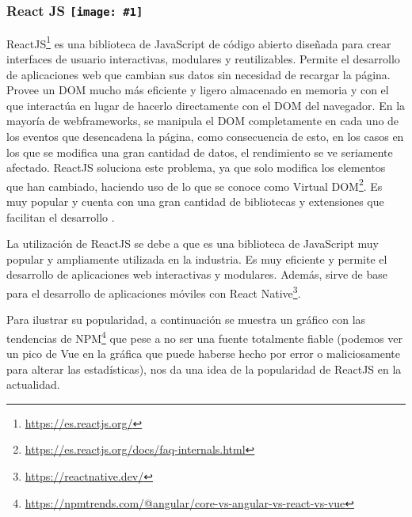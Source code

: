 
\renewcommand{\icon}[1]{\texttt{[image: \#1]}}
\subsubsection*{React JS \protect\icon{./imagenes/react_logo.png}}

ReactJS\footnote{\url{https://es.reactjs.org/}} es una biblioteca de JavaScript de código abierto diseñada para crear interfaces de usuario interactivas, modulares y reutilizables. Permite el desarrollo de aplicaciones web que cambian sus datos sin necesidad de recargar la página. Provee un DOM mucho más eficiente y ligero almacenado en memoria y con el que interactúa en lugar de hacerlo directamente con el DOM del navegador. En la mayoría de webframeworks, se manipula el DOM completamente en cada uno de los eventos que desencadena la página, como consecuencia de esto, en los casos en los que se modifica una gran cantidad de datos, el rendimiento se ve seriamente afectado. ReactJS soluciona este problema, ya que solo modifica los elementos que han cambiado, haciendo uso de lo que se conoce como Virtual DOM\footnote{\url{https://es.reactjs.org/docs/faq-internals.html}}. Es muy popular y cuenta con una gran cantidad de bibliotecas y extensiones que facilitan el desarrollo \cite{aggarwal2018modern}.\newline

La utilización de ReactJS se debe a que es una biblioteca de JavaScript muy popular y ampliamente utilizada en la industria. Es muy eficiente y permite el desarrollo de aplicaciones web interactivas y modulares. Además, sirve de base para el desarrollo de aplicaciones móviles con React Native\footnote{\url{https://reactnative.dev/}}.\newline

Para ilustrar su popularidad, a continuación se muestra un gráfico con las tendencias de NPM\footnote{\url{https://npmtrends.com/@angular/core-vs-angular-vs-react-vs-vue}} que pese a no ser una fuente totalmente fiable (podemos ver un pico de Vue en la gráfica que puede haberse hecho por error o maliciosamente para alterar las estadísticas), nos da una idea de la popularidad de ReactJS en la actualidad.

